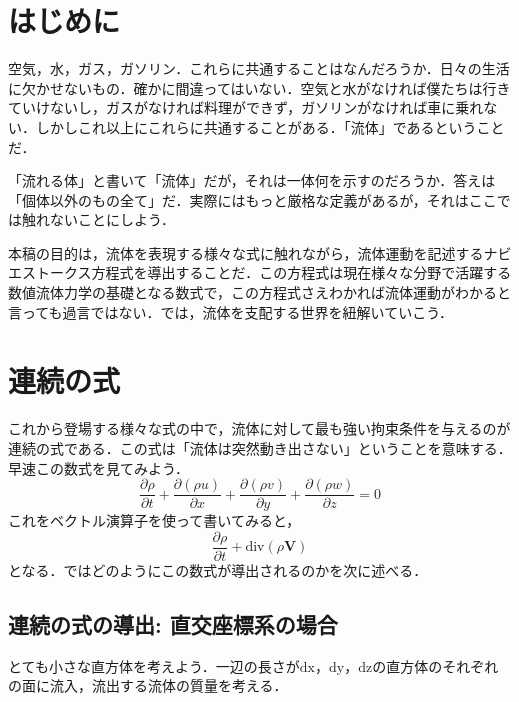 \documentclass{jsarticle}
\newcommand{\pfrac}[2]{\frac{\partial{}{#1}}{\partial{}{#2}}}
\begin{document}
\section{はじめに}
空気，水，ガス，ガソリン．これらに共通することはなんだろうか．日々の生活に欠かせないもの．確かに間違ってはいない．空気と水がなければ僕たちは行きていけないし，ガスがなければ料理ができず，ガソリンがなければ車に乗れない．しかしこれ以上にこれらに共通することがある．「流体」であるということだ．

「流れる体」と書いて「流体」だが，それは一体何を示すのだろうか．答えは「個体以外のもの全て」だ．実際にはもっと厳格な定義があるが，それはここでは触れないことにしよう．

本稿の目的は，流体を表現する様々な式に触れながら，流体運動を記述するナビエストークス方程式を導出することだ．この方程式は現在様々な分野で活躍する数値流体力学の基礎となる数式で，この方程式さえわかれば流体運動がわかると言っても過言ではない．では，流体を支配する世界を紐解いていこう．

\section{連続の式}
これから登場する様々な式の中で，流体に対して最も強い拘束条件を与えるのが連続の式である．この式は「流体は突然動き出さない」ということを意味する．早速この数式を見てみよう．
\begin{equation}
  \pfrac{\rho}{t}+\pfrac{(\rho{}u)}{x}+\pfrac{(\rho{}v)}{y}+\pfrac{(\rho{}w)}{z}=0
\end{equation}
これをベクトル演算子を使って書いてみると，
\begin{equation}
  \pfrac{\rho}{t}+\mathrm{div}(\rho\bm{V})
\end{equation}
となる．ではどのようにこの数式が導出されるのかを次に述べる．
\subsection{連続の式の導出: 直交座標系の場合}\label{chokou}
とても小さな直方体を考えよう．一辺の長さが$\mathrm{dx}$，$\mathrm{dy}$，$\mathrm{dz}$の直方体のそれぞれの面に流入，流出する流体の質量を考える．
\end{document}
